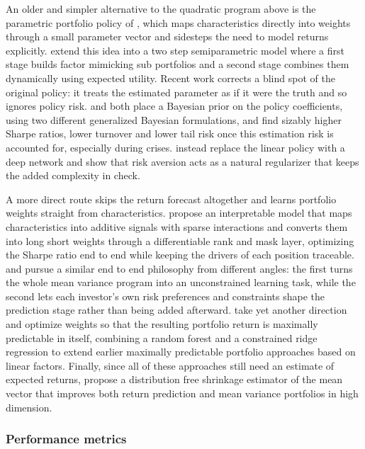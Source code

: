 An older and simpler alternative to the quadratic program above is the parametric portfolio policy of \cite{brandt2009parametric}, which maps characteristics directly into weights through a small parameter vector and sidesteps the need to model returns explicitly. \cite{connor2021dynamic} extend this idea into a two step semiparametric model where a first stage builds factor mimicking sub portfolios and a second stage combines them dynamically using expected utility. Recent work corrects a blind spot of the original policy: it treats the estimated parameter as if it were the truth and so ignores policy risk. \cite{herculano2026bayesian} and \cite{lamoureux2026gibbs} both place a Bayesian prior on the policy coefficients, using two different generalized Bayesian formulations, and find sizably higher Sharpe ratios, lower turnover and lower tail risk once this estimation risk is accounted for, especially during crises. \cite{simon2025deep} instead replace the linear policy with a deep network and show that risk aversion acts as a natural regularizer that keeps the added complexity in check.

A more direct route skips the return forecast altogether and learns portfolio weights straight from characteristics. \cite{bell2026alphaglass} propose an interpretable model that maps characteristics into additive signals with sparse interactions and converts them into long short weights through a differentiable rank and mask layer, optimizing the Sharpe ratio end to end while keeping the drivers of each position traceable. \cite{you2025markowitz} and \cite{wang2026machine} pursue a similar end to end philosophy from different angles: the first turns the whole mean variance program into an unconstrained learning task, while the second lets each investor's own risk preferences and constraints shape the prediction stage rather than being added afterward. \cite{coulombe2023maximally} take yet another direction and optimize weights so that the resulting portfolio return is maximally predictable in itself, combining a random forest and a constrained ridge regression to extend earlier maximally predictable portfolio approaches based on linear factors. Finally, since all of these approaches still need an estimate of expected returns, \cite{asimit2025distribution} propose a distribution free shrinkage estimator of the mean vector that improves both return prediction and mean variance portfolios in high dimension.

\subsubsection{Performance metrics}

